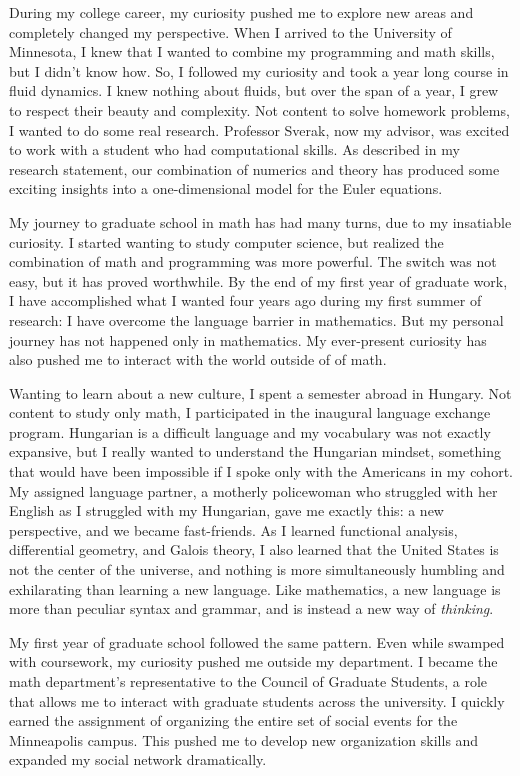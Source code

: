 \documentclass[12pt]{article}
\begin{document}
During my college career, my curiosity pushed me to explore new areas and completely changed my perspective. When I arrived to the University of Minnesota, I knew that I wanted to combine my programming and math skills, but I didn't know how. So, I followed my curiosity and took a year long course in fluid dynamics. I knew nothing about fluids, but over the span of a year, I grew to respect their beauty and complexity. Not content to solve homework problems, I wanted to do some real research. Professor Sverak, now my advisor, was excited to work with a student who had computational skills. As described in my research statement, our combination of numerics and theory has produced some exciting insights into a one-dimensional model for the Euler equations.

My journey to graduate school in math has had many turns, due to my insatiable curiosity. I started wanting to study computer science, but realized the combination of math and programming was more powerful. The switch was not easy, but it has proved worthwhile. By the end of my first year of graduate work, I have accomplished what I wanted four years ago during my first summer of research: I have overcome the language barrier in mathematics. But my personal journey has not happened only in mathematics. My ever-present curiosity has also pushed me to interact with the world outside of of math.

Wanting to learn about a new culture, I spent a semester abroad in Hungary. Not content to study only math, I participated in the inaugural language exchange program. Hungarian is a difficult language and my vocabulary was not exactly expansive, but I really wanted to understand the Hungarian mindset, something that would have been impossible if I spoke only with the Americans in my cohort. My assigned language partner, a motherly policewoman who struggled with her English as I struggled with my Hungarian, gave me exactly this: a new perspective, and we became fast-friends. As I learned functional analysis, differential geometry, and Galois theory, I also learned that the United States is not the center of the universe, and nothing is more simultaneously humbling and exhilarating than learning a new language. Like mathematics, a new language is more than peculiar syntax and grammar, and is instead a new way of \textit{thinking}.  

My first year of graduate school followed the same pattern. Even while swamped with coursework, my curiosity pushed me outside my department. I became the math department's representative to the Council of Graduate Students, a role that allows me to interact with graduate students across the university. I quickly earned the assignment of organizing the entire set  of social events for the Minneapolis campus. This pushed me to develop new organization skills and expanded my social network dramatically. 
\end{document}
